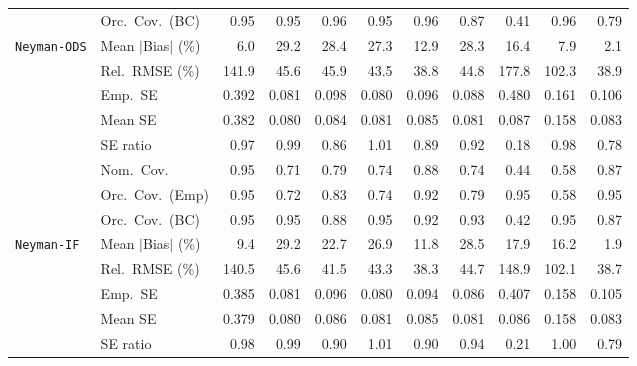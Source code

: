 \begin{landscape}
\begin{longtable}{llrrrrrrrrr}
 & Orc.\ Cov.\ (BC) & \cellcolor{rankone}0.95 & \cellcolor{rankone}0.95 & \cellcolor{ranktwo}0.96 & \cellcolor{rankone}0.95 & \cellcolor{ranktwo}0.96 & \cellcolor{rankthree}0.87 & 0.41 & \cellcolor{ranktwo}0.96 & 0.79 \\
\addlinespace[2pt]
\quad \texttt{Neyman-ODS} & Mean $|$Bias$|$ (\%) & \cellcolor{ranktwo}6.0 & 29.2 & 28.4 & 27.3 & 12.9 & 28.3 & 16.4 & \cellcolor{rankthree}7.9 & \cellcolor{rankone}2.1 \\
 & Rel.\ RMSE (\%) & 141.9 & 45.6 & 45.9 & \cellcolor{rankthree}43.5 & \cellcolor{rankone}38.8 & 44.8 & 177.8 & 102.3 & \cellcolor{ranktwo}38.9 \\
 & Emp.\ SE & 0.392 & 0.081 & 0.098 & 0.080 & 0.096 & 0.088 & 0.480 & 0.161 & 0.106 \\
 & Mean SE & 0.382 & 0.080 & 0.084 & 0.081 & 0.085 & 0.081 & 0.087 & 0.158 & 0.083 \\
 & SE ratio & \cellcolor{rankthree}0.97 & \cellcolor{rankone}0.99 & 0.86 & \cellcolor{rankone}1.01 & 0.89 & 0.92 & 0.18 & \cellcolor{ranktwo}0.98 & 0.78 \\
 & Nom.\ Cov. & \cellcolor{rankone}0.95 & 0.71 & 0.79 & 0.74 & \cellcolor{ranktwo}0.88 & 0.74 & 0.44 & 0.58 & \cellcolor{rankthree}0.87 \\
 & Orc.\ Cov.\ (Emp) & \cellcolor{rankone}0.95 & 0.72 & \cellcolor{rankthree}0.83 & 0.74 & \cellcolor{ranktwo}0.92 & 0.79 & \cellcolor{rankone}0.95 & 0.58 & \cellcolor{rankone}0.95 \\
 & Orc.\ Cov.\ (BC) & \cellcolor{rankone}0.95 & \cellcolor{rankone}0.95 & 0.88 & \cellcolor{rankone}0.95 & \cellcolor{rankthree}0.92 & \cellcolor{ranktwo}0.93 & 0.42 & \cellcolor{rankone}0.95 & 0.87 \\
\addlinespace[2pt]
\quad \texttt{Neyman-IF} & Mean $|$Bias$|$ (\%) & \cellcolor{ranktwo}9.4 & 29.2 & 22.7 & 26.9 & \cellcolor{rankthree}11.8 & 28.5 & 17.9 & 16.2 & \cellcolor{rankone}1.9 \\
 & Rel.\ RMSE (\%) & 140.5 & 45.6 & \cellcolor{rankthree}41.5 & 43.3 & \cellcolor{rankone}38.3 & 44.7 & 148.9 & 102.1 & \cellcolor{ranktwo}38.7 \\
 & Emp.\ SE & 0.385 & 0.081 & 0.096 & 0.080 & 0.094 & 0.086 & 0.407 & 0.158 & 0.105 \\
 & Mean SE & 0.379 & 0.080 & 0.086 & 0.081 & 0.085 & 0.081 & 0.086 & 0.158 & 0.083 \\
 & SE ratio & \cellcolor{rankthree}0.98 & \cellcolor{ranktwo}0.99 & 0.90 & \cellcolor{ranktwo}1.01 & 0.90 & 0.94 & 0.21 & \cellcolor{rankone}1.00 & 0.79 \\

\end{longtable}
\end{landscape}
